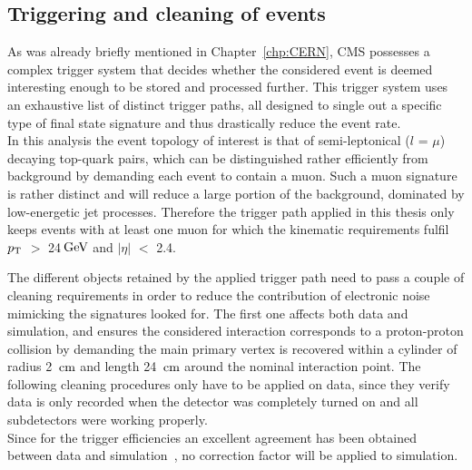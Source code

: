 \subsection{Triggering and cleaning of events}\label{subsec::Trigger}
As was already briefly mentioned in Chapter~\ref{chp:CERN}, CMS possesses a complex trigger system that decides whether the considered event is deemed interesting enough to be stored and processed further.
This trigger system uses an exhaustive list of distinct trigger paths, all designed to single out a specific type of final state signature and thus drastically reduce the event rate.
\\

In this analysis the event topology of interest is that of semi-leptonical ($l$ = $\mu$) decaying top-quark pairs, which can be distinguished rather efficiently from background by demanding each event to contain a muon. Such a muon signature is rather distinct and will reduce a large portion of the background, dominated by low-energetic jet processes.
Therefore the trigger path applied in this thesis only keeps events with at least one muon for which the kinematic requirements fulfil $p_{\rm T}$ $>$ 24$\, \mathrm{GeV}$ and $\vert \eta \vert$ $<$ 2.4.

The different objects retained by the applied trigger path need to pass a couple of cleaning requirements in order to reduce the contribution of electronic noise mimicking the signatures looked for.
The first one affects both data and simulation, and ensures the considered interaction corresponds to a proton-proton collision by demanding the main primary vertex is recovered within a cylinder of radius 2 $\, \mathrm{cm}$ and length 24 $\, \mathrm{cm}$ around the nominal interaction point.
The following cleaning procedures only have to be applied on data, since they verify data is only recorded when the detector was completely turned on and all subdetectors were working properly.
\\

Since for the trigger efficiencies an excellent agreement has been obtained between data and simulation~\cite{MuonPerf8TeV}, no correction factor will be applied to simulation. %

